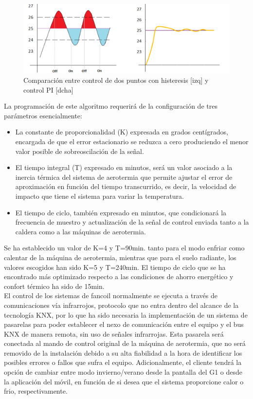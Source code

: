\begin{itemize}
\bigskip
\begin{figure}[H]
\includegraphics[width=1.15\textwidth]{figures/metodos_control.png}   
\caption{Comparación entre control de dos puntos con histeresis [izq] y control PI [dcha]}
\label{fig:metodos_control}
\end{figure}
\bigskip
La programación de este algoritmo requerirá de la configuración de tres parámetros esencialmente:
	
	\begin{itemize} 
	\item La constante de proporcionalidad (K) expresada en grados centígrados, encargada de que el error estacionario se 	reduzca a cero produciendo el menor valor posible de sobreoscilación de la señal. 
	\item El tiempo integral (T) expresado en minutos, será un valor asociado a la inercia térmica del sistema de aerotermia que 				permite ajustar el error de aproximación en función del tiempo transcurrido, es decir, la velocidad de impacto que tiene el 	sistema para variar la temperatura.
	\item El tiempo de ciclo, también expresado en minutos, que condicionará la frecuencia de muestro y actualización de la señal de 			control enviada tanto a la caldera como a las máquinas de aerotermia.
	\end{itemize} 
Se ha establecido un valor de K=4 y T=90min. tanto para el modo enfriar como calentar de la máquina de aerotermia, mientras que para el suelo radiante, los valores escogidos han sido K=5 y T=240min. El tiempo de ciclo que se ha encontrado más optimizado respecto a las condiciones de ahorro energético y confort térmico ha sido de 15min. \\
El control de los sistemas de fancoil normalmente se ejecuta a través de comunicaciones vía infrarrojos, protocolo que no entra dentro del alcance de la tecnología KNX, por lo que ha sido necesaria la implementación de un sistema de pasarelas para poder establecer el nexo de comunicación entre el equipo y el bus KNX de manera remota, sin uso de señales infrarrojas. Esta pasarela será conectada al mando de control original de la máquina de aerotermia, que no será removido de la instalación debido a su alta fiabilidad a la hora de identificar los posibles errores o fallos que sufra el equipo. Adicionalmente, el cliente tendrá la opción de cambiar entre modo invierno/verano desde la pantalla del G1 o desde la aplicación del móvil, en función de si desea que el sistema proporcione calor o frio, respectivamente.\\


\end{itemize}
